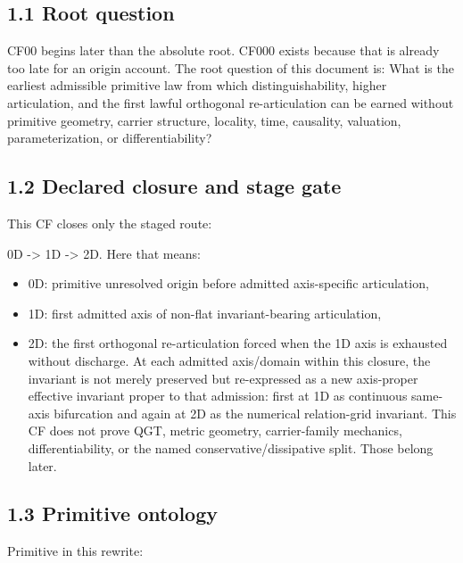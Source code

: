 \documentclass[11pt]{article}
\begin{document}
\subsection{1.1 Root question}\label{root-question}

CF00 begins later than the absolute root. CF000 exists because that is already too late for an origin account. The root question of this document is: What is the earliest admissible primitive law from which distinguishability, higher articulation, and the first lawful orthogonal re-articulation can be earned without primitive geometry, carrier structure, locality, time, causality, valuation, parameterization, or differentiability?

\subsection{1.2 Declared closure and stage gate}\label{declared-closure-and-stage-gate}

This CF closes only the staged route:

0D -\textgreater{} 1D -\textgreater{} 2D. Here that means:

\begin{itemize}
\item
  0D: primitive unresolved origin before admitted axis-specific articulation,
\item
  1D: first admitted axis of non-flat invariant-bearing articulation,
\item
  2D: the first orthogonal re-articulation forced when the 1D axis is exhausted without discharge. At each admitted axis/domain within this closure, the invariant is not merely preserved but re-expressed as a new axis-proper effective invariant proper to that admission: first at 1D as continuous same-axis bifurcation and again at 2D as the numerical relation-grid invariant. This CF does not prove QGT, metric geometry, carrier-family mechanics, differentiability, or the named conservative/dissipative split. Those belong later.
\end{itemize}

\subsection{1.3 Primitive ontology}\label{primitive-ontology}

Primitive in this rewrite:
\end{document}

